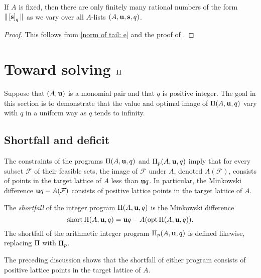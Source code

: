 \documentclass{amsart}
\begin{document}
\begin{corollary}\label{finitely many coord sums: C}
   If $A$ is fixed, then there are only finitely many rational numbers of the form $ \| \left[ \mathbf{s} \right]_q \|$ as we vary over all $A$-lists $(A, \mathbf{u}, \mathbf{s}, q)$.
\end{corollary}

\begin{proof}
   This follows from \eqref{norm of tail: e} and the proof of .
\end{proof}

\section{Toward solving $\Pi$}
\label{solving: S}

Suppose that $(A, \mathbf{u})$ is a monomial pair and that $q$ is positive integer.
The goal in this section is to demonstrate that the value and optimal image of $\Pi(A, \mathbf{u}, q)$ vary with $q$ in a uniform way as $q$ tends to infinity.

\subsection{Shortfall and deficit}

The constraints of the programs $\Pi(A,\mathbf{u},q)$ and $\Pi_p(A,\mathbf{u},q)$ imply that for every subset $\mathcal{F}$ of their feasible sets, the image of $\mathcal{F}$ under $A$, denoted $A(\mathcal{F})$, consists of points in the target lattice of $A$ less than $\mathbf{u}q$.
In particular, the Minkowski difference $\mathbf{u}q-A(\mathcal{F})$ consists of positive lattice points in the target lattice of $A$.

\begin{definition}
   The \emph{shortfall} of the integer program $\Pi(A, \mathbf{u}, q)$ is the Minkowski difference
   \[ \operatorname{short} \Pi(A, \mathbf{u}, q) = \mathbf{u}q - A( \operatorname{opt} \Pi(A, \mathbf{u}, q)).\]
   The shortfall of the arithmetic integer program $\Pi_p(A, \mathbf{u}, q)$ is defined likewise, replacing $\Pi$ with $\Pi_p$.
\end{definition}

The preceding discussion shows that the shortfall of either program consists of positive lattice points in the target lattice of $A$.
\end{document}
